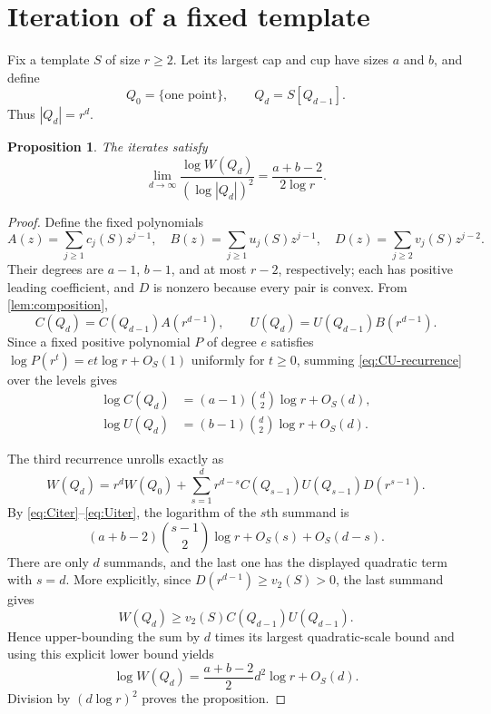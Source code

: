 \documentclass[11pt]{article}
\newtheorem{proposition}[theorem]{Proposition}
\theoremstyle{remark}
\begin{document}
\section{Iteration of a fixed template}

Fix a template $S$ of size $r\ge2$.  Let its largest cap and cup have sizes
$a$ and $b$, and define
\[
 Q_0=\{\text{one point}\},\qquad Q_d=S[Q_{d-1}].              \tag{3.1}
\]
Thus $|Q_d|=r^d$.

\begin{proposition}\label{prop:template-rate}
The iterates satisfy
\[
 \lim_{d\to\infty}
 \frac{\log W(Q_d)}{(\log|Q_d|)^2}
 =\frac{a+b-2}{2\log r}.                          \tag{3.2}
\]
\end{proposition}

\begin{proof}
Define the fixed polynomials
\[
 A(z)=\sum_{j\ge1}c_j(S)z^{j-1},\quad
 B(z)=\sum_{j\ge1}u_j(S)z^{j-1},\quad
 D(z)=\sum_{j\ge2}v_j(S)z^{j-2}.                 \tag{3.3}
\]
Their degrees are $a-1$, $b-1$, and at most $r-2$, respectively; each has
positive leading coefficient, and $D$ is nonzero because every pair is
convex.  From \cref{lem:composition},
\[
 C(Q_d)=C(Q_{d-1})A(r^{d-1}),\qquad
 U(Q_d)=U(Q_{d-1})B(r^{d-1}).                     \tag{3.4}\label{eq:CU-recurrence}
\]
Since a fixed positive polynomial $P$ of degree $e$ satisfies
$\log P(r^t)=et\log r+O_S(1)$ uniformly for $t\ge0$, summing
\eqref{eq:CU-recurrence} over the levels gives
\begin{align}
 \log C(Q_d)&=(a-1)\binom d2\log r+O_S(d),\tag{3.5}\label{eq:Citer}\\
 \log U(Q_d)&=(b-1)\binom d2\log r+O_S(d).\tag{3.6}\label{eq:Uiter}
\end{align}

The third recurrence unrolls exactly as
\[
 W(Q_d)=r^dW(Q_0)+
 \sum_{s=1}^d r^{d-s}C(Q_{s-1})U(Q_{s-1})D(r^{s-1}).          \tag{3.7}
\]
By \eqref{eq:Citer}--\eqref{eq:Uiter}, the logarithm of the $s$th summand is
\[
 (a+b-2)\binom{s-1}{2}\log r+O_S(s)+O_S(d-s).                 \tag{3.8}
\]
There are only $d$ summands, and the last one has the displayed quadratic
term with $s=d$.  More explicitly, since
$D(r^{d-1})\ge v_2(S)>0$, the last summand gives
\[
 W(Q_d)\ge v_2(S)C(Q_{d-1})U(Q_{d-1}).
\]
Hence upper-bounding the sum by $d$ times its largest quadratic-scale bound
and using this explicit lower bound yields
\[
 \log W(Q_d)=\frac{a+b-2}{2}d^2\log r+O_S(d).                 \tag{3.9}
\]
Division by $(d\log r)^2$ proves the proposition.
\end{proof}
\end{document}
